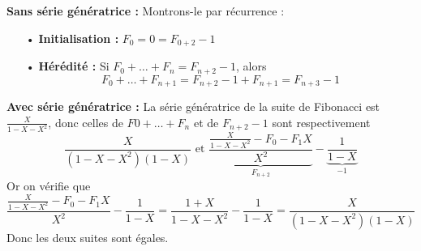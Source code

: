 \begin{sol}
\textbf{Sans série génératrice :} Montrons-le par récurrence :
\begin{itemize}
\item[•] \textbf{Initialisation :} $F_0 = 0 = F_{0 + 2} - 1$
\item[•] \textbf{Hérédité :} Si $F_0 + \dots + F_n = F_{n + 2} - 1$, alors
$$F_0 + \dots + F_{n + 1} = F_{n + 2} - 1 + F_{n + 1} = F_{n + 3} - 1$$ 
\end{itemize}
\textbf{Avec série génératrice :} La série génératrice de la suite de Fibonacci est $\frac X{1 - X - X^2}$, donc celles de $F0 + \dots + F_n$ et de $F_{n + 2} - 1$ sont respectivement
$$\frac X{(1 - X - X^2)(1 - X)} \text{ et } \underbrace{\frac{\frac X{1 - X - X^2} - F_0 - F_1X}{X^2}}_{F_{n + 2}} - \underbrace{\frac{1}{1 - X}}_{-1}$$
Or on vérifie que
$$\frac{\frac X{1 - X - X^2} - F_0 - F_1X}{X^2} - \frac{1}{1 - X} = \frac{1 + X}{1 - X - X^2} - \frac{1}{1 - X} = \frac X{(1 - X - X^2)(1 - X)}$$ 
Donc les deux suites sont égales.
\end{sol}


